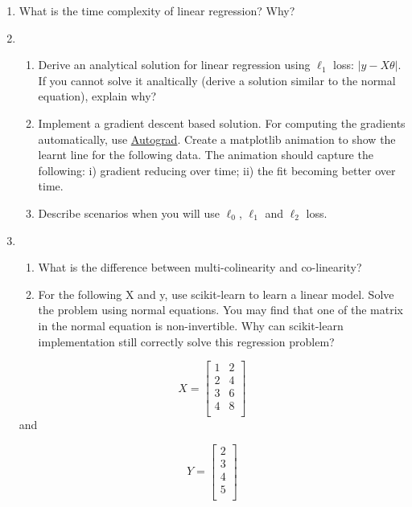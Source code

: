 \documentclass[colorlinks,linkcolor=true]{article}
\begin{document}
\begin{enumerate}
	\item What is the time complexity of linear regression? Why?
	\item \begin{enumerate}
		\item Derive an analytical solution for linear regression using $\ell_1$ loss: $|y-X\theta|$. If you cannot solve it analtically (derive a solution similar to the normal equation), explain why? 
		\item Implement a gradient descent based solution. For computing the gradients automatically, use \href{https://github.com/HIPS/autograd}{Autograd}. Create a matplotlib animation to show the learnt line for the following data. The animation should capture the following: i) gradient reducing over time; ii) the fit becoming better over time.
		\item Describe scenarios when you will use $\ell_0$, $\ell_1$ and $\ell_2$ loss.
	\end{enumerate}
	\item \begin{enumerate}
		\item What is the difference between multi-colinearity and co-linearity? 
		\item 	For the following X and y, use scikit-learn to learn a linear model. Solve the problem using normal equations. You may find that one of the matrix in the normal equation is non-invertible. Why can scikit-learn implementation still correctly solve this regression problem?
	\end{enumerate}
	

	
$$X = \begin{bmatrix}

	
	1       & 2 \\
    2      &  4  \\
    3      &  6  \\
    4      &  8  \\

	\end{bmatrix}$$
	and 
	
	$$Y = \begin{bmatrix}
	
	
 2 \\
  3  \\
  4  \\
	5  \\
	
	\end{bmatrix}$$



\end{enumerate}
\end{document}
